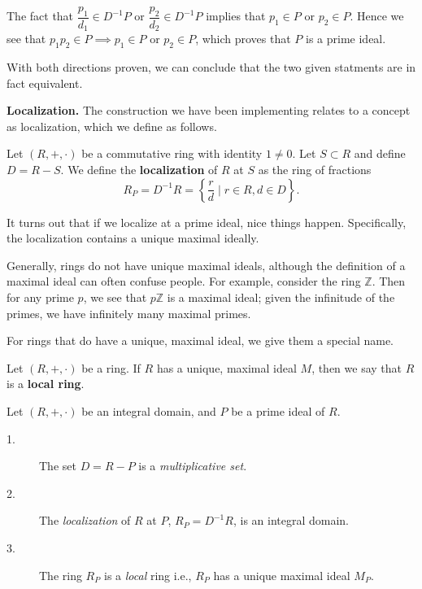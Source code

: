 \documentclass[12pt,letterpaper]{algebra_book}
\theoremstyle{definition}
\begin{document}
\begin{prf}
\begin{description}
        The fact that $\dfrac{p_1}{d_1} \in D^{-1}P$ or
        $\dfrac{p_2}{d_2} \in D^{-1}P$ implies that $p_1 \in P$ or
        $p_2 \in P$. Hence we see that $p_1p_2 \in P \implies p_1 \in
        P$ or $p_2 \in P$, which proves that $P$ is a prime ideal.
    \end{description}
    With both directions proven, we can conclude that the two given
    statments are in fact equivalent.
\end{prf}

\textbf{Localization.}
The construction we have been implementing relates to a concept
as localization, which we define as follows. 
\begin{definition}
    Let $(R, +, \cdot)$ be a commutative ring with identity $1 \ne
    0$. Let $S \subset R$ and define $D = R - S$. We define the
    \textbf{localization} of 
    $R$ at $S$ as the ring of fractions 
    \[
        R_P = D^{-1}R = \left\{ \frac{r}{d} \mid r \in R, d \in D \right\}.
    \]
\end{definition}
It turns out that if we localize at a prime ideal, nice things
happen. Specifically, the localization contains a unique maximal
ideally. 

Generally, rings do not have unique maximal ideals, although the
definition of a maximal ideal can often confuse people. For
example, consider the ring $\mathbb{Z}$. Then for any prime $p$,
we see that $p\mathbb{Z}$ is a maximal ideal; given the infinitude
of the primes, we have infinitely many maximal primes. 

For rings that do have a unique, maximal ideal, we give them a
special name. 

\begin{definition}
    Let $(R, +, \cdot)$ be a ring. If $R$ has a unique, maximal
    ideal $M$, then we say that $R$ is a \textbf{local ring}.
\end{definition}

\begin{thm}
    Let $(R, +, \cdot)$ be an integral domain, and $P$ be a prime
    ideal of $R$. 
    \begin{description}
        \item[1.] The set $D = R - P$ is a \textit{multiplicative set}.

        \item[2.] The \textit{localization} of $R$ at $P$, $R_P =
        D^{-1}R$, is an integral domain. 

        \item[3.] The ring $R_P$ is a \textit{local} ring i.e., $R_P$ has
        a unique maximal ideal $M_P$.
    \end{description}
\end{thm}
\end{document}
